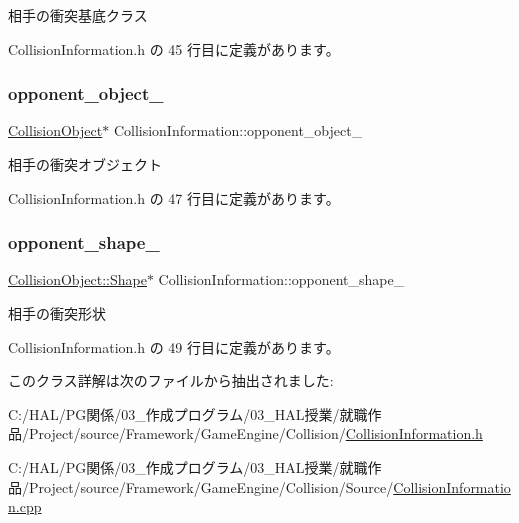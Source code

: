 相手の衝突基底クラス 



 Collision\+Information.\+h の 45 行目に定義があります。

\mbox{\label{class_collision_information_a0050ea8230d1d6ec83d2859ac71be20f}} 
\subsubsection{\texorpdfstring{opponent\+\_\+object\+\_\+}{opponent\_object\_}}
{\footnotesize\ttfamily \mbox{\hyperlink{class_collision_object}{Collision\+Object}}$\ast$ Collision\+Information\+::opponent\+\_\+object\+\_\+\hspace{0.3cm}{\ttfamily [private]}}



相手の衝突オブジェクト 



 Collision\+Information.\+h の 47 行目に定義があります。

\mbox{\label{class_collision_information_ab09b1a156c939f009f7c72be1dcfa917}} 
\subsubsection{\texorpdfstring{opponent\+\_\+shape\+\_\+}{opponent\_shape\_}}
{\footnotesize\ttfamily \mbox{\hyperlink{class_collision_object_1_1_shape}{Collision\+Object\+::\+Shape}}$\ast$ Collision\+Information\+::opponent\+\_\+shape\+\_\+\hspace{0.3cm}{\ttfamily [private]}}



相手の衝突形状 



 Collision\+Information.\+h の 49 行目に定義があります。



このクラス詳解は次のファイルから抽出されました\+:\begin{DoxyCompactItemize}
\item 
C\+:/\+H\+A\+L/\+P\+G関係/03\+\_\+作成プログラム/03\+\_\+\+H\+A\+L授業/就職作品/\+Project/source/\+Framework/\+Game\+Engine/\+Collision/\mbox{\hyperlink{_collision_information_8h}{Collision\+Information.\+h}}\item 
C\+:/\+H\+A\+L/\+P\+G関係/03\+\_\+作成プログラム/03\+\_\+\+H\+A\+L授業/就職作品/\+Project/source/\+Framework/\+Game\+Engine/\+Collision/\+Source/\mbox{\hyperlink{_collision_information_8cpp}{Collision\+Information.\+cpp}}\end{DoxyCompactItemize}
